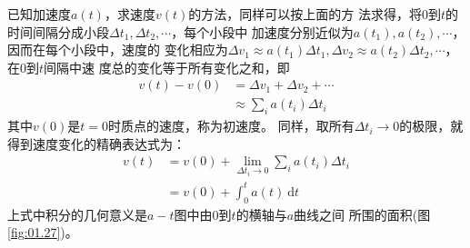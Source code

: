 \documentclass[../outline-of-mechanics.tex]{subfiles}
\begin{document}
已知加速度$a\left(t\right)$，求速度$v\left(t\right)$的方法，同样可以按上面的方
法求得，将0到$t$的时间间隔分成小段$\Delta t_1 , \Delta t_2 , \cdots$，每个小段中
加速度分别近似为$a\left(t_1\right) , a\left(t_2\right) , \cdots$，因而在每个小段中，速度的
变化相应为$\Delta v_1\approx a\left(t_1\right)\Delta t_1 , \Delta v_2\approx a\left(t_2\right)\Delta t_2 , \cdots$，在0到$t$间隔中速
度总的变化等于所有变化之和，即
\begin{equation}\label{eqn:01.11.05}
  \begin{aligned}
    v\left(t\right)-v\left(0\right) & =\Delta v_{1}+\Delta v_{2}+\cdots                 \\
                                    & \approx \sum_{i} a\left(t_{i}\right) \Delta t_{i}
  \end{aligned}
\end{equation}
其中$v\left(0\right)$是$t=0$时质点的速度，称为初速度。
同样，取所有$\Delta t _ i \to 0$的极限，就得到速度变化的精确表达式为：
\begin{equation}\label{eqn:01.11.06}
  \begin{aligned}
    v\left(t\right) & =v\left(0\right)+\lim _{\Delta t_{i} \rightarrow 0} \sum_ i a\left(t_{i}\right) \Delta t_{i} \\
                    & =v\left(0\right)+\int_{0}^{t} a\left(t\right) {~\mathrm d} t
  \end{aligned}
\end{equation}
上式中积分的几何意义是$a-t$图中由0到$t$的横轴与$a$曲线之间
所围的面积(图\ref{fig:01.27})。
\end{document}
